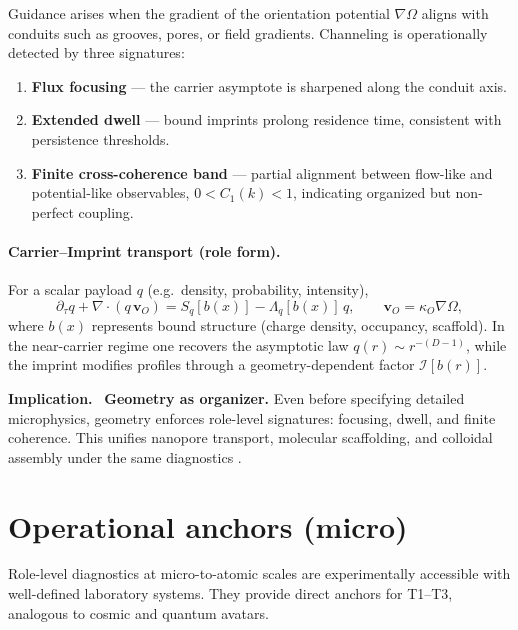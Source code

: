 \documentclass[12pt,a4paper,oneside]{scrreprt}
\newenvironment{implication}{\par\vspace{0.5em}\noindent\textbf{Implication.}\ }{\par\vspace{0.5em}}
\begin{document}
Guidance arises when the gradient of the orientation potential 
$\nabla \Omega$ aligns with conduits such as grooves, pores, or 
field gradients. 
Channeling is operationally detected by three signatures: 
\begin{enumerate}[label=(\roman*)]
  \item \textbf{Flux focusing} --- the carrier asymptote is sharpened 
  along the conduit axis. 
  \item \textbf{Extended dwell} --- bound imprints prolong residence time, 
  consistent with persistence thresholds. 
  \item \textbf{Finite cross-coherence band} --- partial alignment between 
  flow-like and potential-like observables, 
  $0<C_1(k)<1$, indicating organized but non-perfect coupling. 
\end{enumerate}

\paragraph{Carrier–Imprint transport (role form).}
For a scalar payload $q$ (e.g.\ density, probability, intensity),
\[
\partial_{\tau} q + \nabla \!\cdot (q\,\mathbf v_O) 
= S_q[b(x)] - \Lambda_q[b(x)]\,q,
\qquad \mathbf v_O = \kappa_O \nabla \Omega,
\]
where $b(x)$ represents bound structure (charge density, occupancy, 
scaffold). 
In the near-carrier regime one recovers the asymptotic law 
$q(r) \sim r^{-(D-1)}$, while the imprint modifies profiles through 
a geometry-dependent factor $\mathcal I[b(r)]$. 

\begin{implication}
\textbf{Geometry as organizer.} 
Even before specifying detailed microphysics, geometry enforces 
role-level signatures: focusing, dwell, and finite coherence. 
This unifies nanopore transport, molecular scaffolding, and colloidal 
assembly under the same diagnostics \citep{Dekker2007Nanopores,Alberts2015Cell}.
\end{implication}

\section{Operational anchors (micro)}\label{sec:micro-anchors}

Role-level diagnostics at micro-to-atomic scales are 
experimentally accessible with well-defined laboratory systems. 
They provide direct anchors for T1--T3, analogous to cosmic 
and quantum avatars. 
\end{document}
